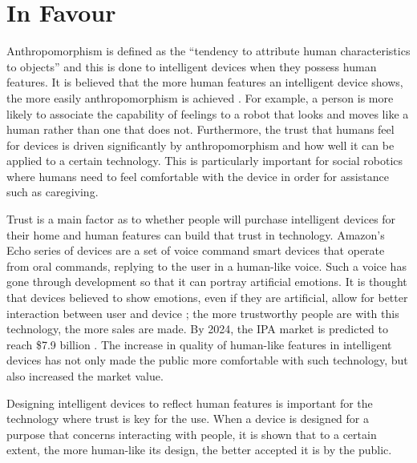 \documentclass{article}
\begin{document}
\section{In Favour}
Anthropomorphism is defined as the “tendency to attribute human characteristics to objects” \cite{woods2004anthropomorphism} and this is done to intelligent devices when they possess human features. It is believed that the more human features an intelligent device shows, the more easily anthropomorphism is achieved \cite{vanPinxteren2019features}. For example, a person is more likely to associate the capability of feelings to a robot that looks and moves like a human rather than one that does not. Furthermore, the trust that humans feel for devices is driven significantly by anthropomorphism \cite{woods2004anthropomorphism} and how well it can be applied to a certain technology. This is particularly important for social robotics where humans need to feel comfortable with the device in order for assistance such as caregiving.\par
Trust is a main factor as to whether people will purchase intelligent devices for their home and human features can build that trust in technology. Amazon’s Echo series of devices are a set of voice command smart devices that operate from oral commands, replying to the user in a human-like voice. Such a voice has gone through development so that it can portray artificial emotions. It is thought that devices believed to show emotions, even if they are artificial, allow for better interaction between user and device \cite{buiu2011emotions}; the more trustworthy people are with this technology, the more sales are made. By 2024, the IPA market is predicted to reach \$7.9 billion \cite{tmr2016market}. The increase in quality of human-like features in intelligent devices has not only made the public more comfortable with such technology, but also increased the market value.\par
Designing intelligent devices to reflect human features is important for the technology where trust is key for the use. When a device is designed for a purpose that concerns interacting with people, it is shown that to a certain extent, the more human-like its design, the better accepted it is by the public.
\end{document}
